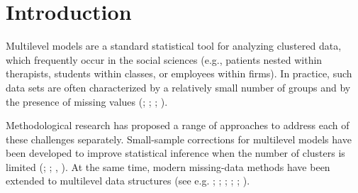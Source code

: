 \documentclass[
  letterpaper,
  11pt,
  english,
  singlespacing,
  headsepline,
  openany]{MastersDoctoralThesis}
\begin{document}
\endgroup







\mainmatter %

\pagestyle{thesis} %
\newcommand{\keyword}[1]{\textbf{#1}}
\newcommand{\tabhead}[1]{\textbf{#1}}
\newcommand{\code}[1]{\texttt{#1}}
\newcommand{\file}[1]{\texttt{\bfseries#1}}
\newcommand{\option}[1]{\texttt{\itshape#1}}



\chapter{Introduction}\label{introduction}

Multilevel models are a standard statistical tool for analyzing
clustered data, which frequently occur in the social sciences (e.g.,
patients nested within therapists, students within classes, or employees
within firms). In practice, such data sets are often characterized by a
relatively small number of groups and by the presence of missing values
(;
;
;
).

Methodological research has proposed a range of approaches to address
each of these challenges separately. Small-sample corrections for
multilevel models have been developed to improve statistical inference
when the number of clusters is limited (; ;
,
). At the same time, modern missing-data
methods have been extended to multilevel data structures (see e.g.
;
;
; ; ;
).
\end{document}
